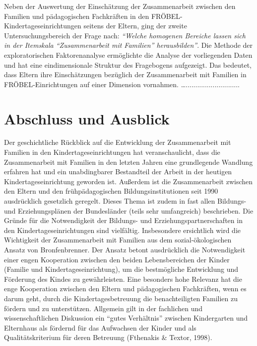 \documentclass[12pt,a4paper]{article}
\begin{document}
	Neben der Auswertung der Einschätzung der Zusammenarbeit zwischen den Familien und pädagogischen Fachkräften in den FRÖBEL-Kinder\-tages\-ein\-rich\-tun\-gen seitens der Eltern, ging der zweite Untersuchungsbereich der Frage nach: \textit{"`Welche homogenen Bereiche lassen sich in der Itemskala "`Zusammenarbeit mit Familien"' herausbilden"'}. Die Methode der exploratorischen Faktorenanalyse er\-mög\-lich\-te die Analyse der vorliegenden Daten und hat eine eindimensionale Struktur des Fragebogens aufgezeigt. Das bedeutet, dass Eltern ihre Einschätzungen bezüglich der Zusammenarbeit mit Familien in FRÖBEL-Einrichtungen auf einer Dimension vornahmen. …............................
	
\section{Abschluss und Ausblick}	
Der geschichtliche Rückblick auf die Entwicklung der Zusammenarbeit mit Familien in den Kindertageseinrichtungen hat veranschaulicht, dass die Zusammenarbeit mit Familien in den letzten Jahren eine grundlegende Wandlung erfahren hat und ein unabdingbarer Bestandteil der Arbeit in der heutigen Kindertageseinrichtung geworden ist. Außerdem ist die Zusammenarbeit zwischen den Eltern und den frühpädagogischen Bildungsinstitutionen seit 1990 ausdrücklich gesetzlich geregelt. Dieses Thema ist zudem in fast allen Bildungs- und Erziehungsplänen der Bundesländer (teils sehr umfangreich) beschrieben. Die Gründe für die Notwendigkeit der Bildungs- und Erziehungspartnerschaften in den Kindertageseinrichtungen sind vielfältig. Insbesondere ersichtlich wird die Wichtigkeit der Zusammenarbeit mit Familien aus dem sozial-ökologischen Ansatz von Bronfenbrenner. Der Ansatz betont ausdrücklich die Notwendigkeit einer engen Kooperation zwischen den beiden Lebensbereichen der Kinder (Familie und Kindertageseinrichtung), um die bestmögliche Entwicklung und Förderung des Kindes zu gewährleisten. Eine besonders hohe Relevanz hat die enge Kooperation zwischen den Eltern und pädagogischen Fachkräften, wenn es darum geht, durch die Kindertagesbetreuung die benachteiligten Familien zu fördern und zu unterstützen. Allgemein gilt in der fachlichen und wissenschaftlichen Diskussion ein "`gutes Verhältnis"' zwischen Kindergarten und Elternhaus als fördernd für das Aufwachsen der Kinder und als Qualitätskriterium für deren Betreuung (Fthenakis \& Textor, 1998).
\end{document}
